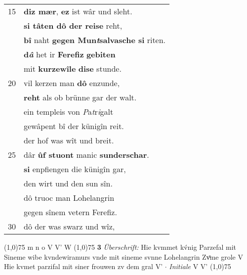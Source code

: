 \documentclass[8pt,a4paper,notitlepage]{article}
\begin{document}
\begin{table}[ht]
\begin{minipage}[t]{0.5\linewidth}
\begin{tabular}{rl}
15 & \textbf{diz mær}, \textbf{ez} ist wâr und sleht.\\ 
 & \textbf{si tâten dô der reise} reht,\\ 
 & \textbf{bî} naht \textbf{gegen Mun\textit{t}salvasche si} riten.\\ 
 & \textbf{d\textit{â}} het ir \textbf{Ferefiz} \textbf{gebiten}\\ 
 & mit \textbf{kurzewîle} \textbf{dise} stunde.\\ 
20 & vil kerzen man \textbf{dô} enzunde,\\ 
 & \textbf{reht} als ob brünne gar der walt.\\ 
 & ein templeis von \textit{P}a\textit{t}r\textit{i}galt\\ 
 & gewâpent bî der künigîn reit.\\ 
 & der hof was wît und breit.\\ 
25 & dâr \textbf{ûf stuont} manic \textbf{sunderschar}.\\ 
 & \textbf{si} enpfiengen die künigîn gar,\\ 
 & den wirt und den sun sîn.\\ 
 & dô truoc man Lohelangrin\\ 
 & gegen sînem vetern Ferefiz.\\ 
30 & dô der was swarz und wîz,\\ 
\end{tabular}
\scriptsize
\line(1,0){75} \newline
m n o V V' W \newline
\line(1,0){75} \newline
\textbf{3} \textit{Überschrift:} Hie kvmmet kv́nig Parzefal mit Sineme wibe kvndewiramurs vnde mit sineme svnne Lohelangrin Zvͦme grole V  Hie kvmet parzifal mit siner frouwen zv dem gral V'   $\cdot$ \textit{Initiale} V V'  \newline
\line(1,0){75} \newline

\end{minipage}
\end{table}
\end{document}
